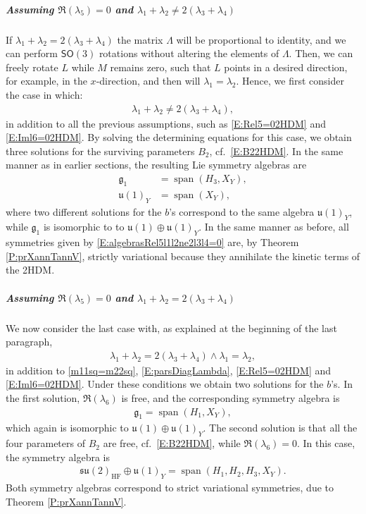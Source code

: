 \documentclass[a4paper,hidelinks, 12pt]{article}
\numberwithin{equation}{section}
\theoremstyle{plain}
\newcommand{\La}{\mathfrak}
\newcommand{\Lg}{\mathsf}
\newcommand{\on}{\operatorname}
\begin{document}
\subparagraph{Assuming $\Re(\lambda_5)= 0$ and $\lambda_1+\lambda_2\ne 2(\lambda_3+\lambda_4)$}
\label{sec:AssumingReLambda50AndLambda1Lambda2Ne2Lambda3Lambda4}
If $\lambda_1+\lambda_2= 2(\lambda_3+\lambda_4)$ the matrix $\Lambda$ will be proportional to identity, and we can perform $\Lg{SO}(3)$ rotations without altering the elements of $\Lambda$. Then, we can freely rotate $L$ while $M$ remains zero, such that $L$ points in a desired direction, for example, in the $x$-direction, and then will $\lambda_1=\lambda_2$. Hence, we first consider the case in which:
\begin{align}
	\lambda_1+\lambda_2\ne 2(\lambda_3+\lambda_4),
\end{align}
in addition to all the previous assumptions, such as \eqref{E:Rel5=02HDM} and \eqref{E:Iml6=02HDM}.
By solving the determining equations for this case, 
we obtain three solutions for the surviving parameters $B_2$, cf.~\eqref{E:B22HDM}. In the same manner as in earlier sections, the resulting Lie symmetry algebras are 
\begin{align}\label{E:algebrasRel5l1l2ne2l3l4=0}
	\La{g}_1 &=\on{span}(H_3,X_Y),  \\
	\La{u}(1)_Y &=\on{span}(X_Y),
\end{align}
where two different solutions for the $b$'s correspond to the same algebra $\La{u}(1)_Y$, while $\La{g}_1$ is isomorphic to to 
$\La{u}(1)\oplus \La{u}(1)_Y$.
In the same manner as before, all symmetries given by \eqref{E:algebrasRel5l1l2ne2l3l4=0} are, by Theorem \ref{P:prXannTannV}, strictly variational because they annihilate the kinetic terms of the 2HDM.  

\subparagraph{Assuming $\Re(\lambda_5)= 0$ and $\lambda_1+\lambda_2= 2(\lambda_3+\lambda_4)$}
\label{sec:AssumingReLambda50AndLambda1Lambda2ne2Lambda3Lambda4}
We now consider the last case with, as explained at the beginning of the last paragraph,
\begin{align}
	\lambda_1+\lambda_2= 2(\lambda_3+\lambda_4) \wedge \lambda_1=\lambda_2,
\end{align}
in addition to \eqref{m11sq=m22sq}, \eqref{E:parsDiagLambda}, \eqref{E:Rel5=02HDM} and \eqref{E:Iml6=02HDM}.
Under these conditions we obtain two solutions for the $b$'s. In the first solution, $\Re(\lambda_6)$ is free, and the corresponding symmetry algebra is
\begin{align}
	\La{g}_1= \on{span}(H_1 ,X_Y),
\end{align}
 which again is isomorphic to $\La{u}(1)\oplus \La{u}(1)_Y$.
The second solution is that all the four parameters of $B_2$ are free, cf.~\eqref{E:B22HDM}, while $\Re(\lambda_6)=0$. In this case, the symmetry algebra
is 
\begin{align}
	\La{su}(2)_\text{HF}\oplus
	\La{u}(1)_Y= \on{span}(H_1, H_2, H_3, X_Y).
\end{align}
Both symmetry algebras correspond to strict variational symmetries, due to Theorem \ref{P:prXannTannV}.
\end{document}
